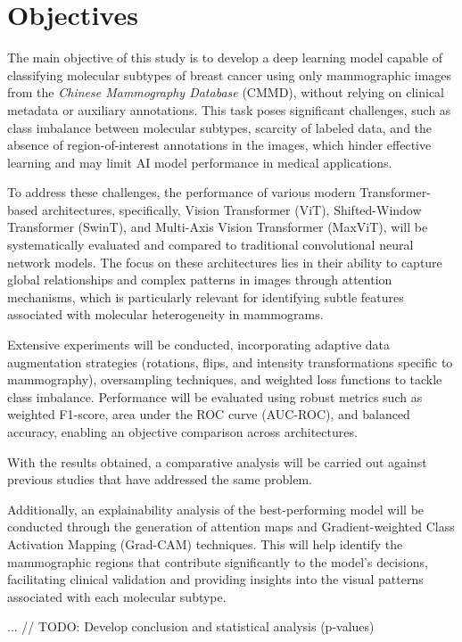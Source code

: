 \documentclass[a4paper,10pt]{book}
\begin{document}
\section{Objectives}

The main objective of this study is to develop a deep learning model capable of classifying molecular subtypes of breast cancer using only mammographic images from the \textit{Chinese Mammography Database} (CMMD), without relying on clinical metadata or auxiliary annotations. This task poses significant challenges, such as class imbalance between molecular subtypes, scarcity of labeled data, and the absence of region-of-interest annotations in the images, which hinder effective learning and may limit AI model performance in medical applications.

To address these challenges, the performance of various modern Transformer-based architectures, specifically, Vision Transformer (ViT), Shifted-Window Transformer (SwinT), and Multi-Axis Vision Transformer (MaxViT), will be systematically evaluated and compared to traditional convolutional neural network models. The focus on these architectures lies in their ability to capture global relationships and complex patterns in images through attention mechanisms, which is particularly relevant for identifying subtle features associated with molecular heterogeneity in mammograms.

Extensive experiments will be conducted, incorporating adaptive data augmentation strategies (rotations, flips, and intensity transformations specific to mammography), oversampling techniques, and weighted loss functions to tackle class imbalance. Performance will be evaluated using robust metrics such as weighted F1-score, area under the ROC curve (AUC-ROC), and balanced accuracy, enabling an objective comparison across architectures.

With the results obtained, a comparative analysis will be carried out against previous studies that have addressed the same problem.

Additionally, an explainability analysis of the best-performing model will be conducted through the generation of attention maps and Gradient-weighted Class Activation Mapping (Grad-CAM) techniques. This will help identify the mammographic regions that contribute significantly to the model's decisions, facilitating clinical validation and providing insights into the visual patterns associated with each molecular subtype.

... // TODO: Develop conclusion and statistical analysis (p-values)
\end{document}
